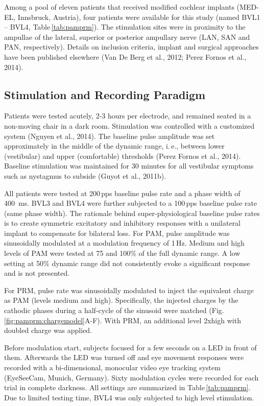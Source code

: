Among a pool of eleven patients that received modified cochlear implants (MED-EL, Innsbruck, Austria), four patients were available for this study (named BVL1 – BVL4, Table\,\ref{tab:pamprm}). The stimulation sites were in proximity to the ampullae of the lateral, superior or posterior ampullary nerve (LAN, SAN and PAN, respectively). Details on inclusion criteria, implant and surgical approaches have been published elsewhere (Van De Berg et al., 2012; Perez Fornos et al., 2014).

\subsection{Stimulation and Recording Paradigm}
Patients were tested acutely, 2-3 hours per electrode, and remained seated in a non-moving chair in a dark room. Stimulation was controlled with a customized system (Nguyen et al., 2014). The baseline pulse amplitude was set approximately in the middle of the dynamic range, i.\,e., between lower (vestibular) and upper (comfortable) thresholds (Perez Fornos et al., 2014). Baseline stimulation was maintained for 30 minutes for all vestibular symptoms such as nystagmus to subside (Guyot et al., 2011b). 
 
All patients were tested at 200\,pps baseline pulse rate and a phase width of \SI{400}{\milli\second}. BVL3 and BVL4 were further subjected to a 100\,pps baseline pulse rate (same phase width). The rationale behind super-physiological baseline pulse rates is to create symmetric excitatory and inhibitory responses with a unilateral implant to compensate for bilateral loss.
For PAM, pulse amplitude was sinusoidally modulated at a modulation frequency of 1\,Hz. Medium and high levels of PAM were tested at 75 and 100\% of the full dynamic range. A low setting at 50\% dynamic range did not consistently evoke a significant response and is not presented. 

For PRM, pulse rate was sinusoidally modulated to inject the equivalent charge as PAM (levels medium and high). Specifically, the injected charges by the cathodic phases during a half-cycle of the sinusoid were matched (Fig.\,\ref{fig:pamprm:chargemodel}A-F). With PRM, an additional level 2xhigh with doubled charge was applied. 

Before modulation start, subjects focused for a few seconds on a LED in front of them. Afterwards the LED was turned off and eye movement responses were recorded with a bi-dimensional, monocular video eye tracking system (EyeSeeCam, Munich, Germany). Sixty modulation cycles were recorded for each trial in complete darkness. All settings are summarized in Table\,\ref{tab:pamprm}. Due to limited testing time, BVL4 was only subjected to high level stimulation.

